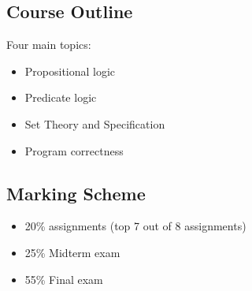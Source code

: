 \documentclass[12pt]{report}
\begin{document}
    \subsection{Course Outline}
      Four main topics:
      \begin{itemize}
        \item Propositional logic
        \item Predicate logic
        \item Set Theory and Specification
        \item Program correctness
      \end{itemize}

    \subsection{Marking Scheme}
      \begin{itemize}
        \item 20\% assignments (top 7 out of 8 assignments)
        \item 25\% Midterm exam
        \item 55\% Final exam
      \end{itemize}
\end{document}
